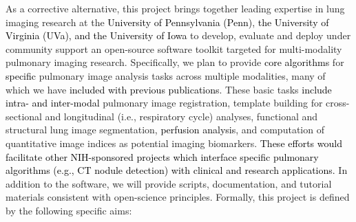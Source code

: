 \documentclass[11pt,]{article}
\begin{document}
As a corrective alternative, this project brings together leading
expertise in lung imaging research at the
\textcolor{black}{University of Pennsylvania (Penn)},
\textcolor{black}{the University of Virginia (UVa), and the University of Iowa}
to develop, evaluate and deploy under community support an open-source
software toolkit targeted for multi-modality pulmonary imaging research.
Specifically, we plan to provide \textcolor{black}{core algorithms} for
\textcolor{black}{specific} pulmonary image analysis tasks across
multiple modalities, many of which we have
\textcolor{black}{included with previous publications}. These basic
tasks \textcolor{black}{include intra- and inter-modal} pulmonary image
registration, template building for cross-sectional and longitudinal
(i.e., respiratory cycle) analyses, functional and structural lung image
segmentation, \textcolor{black}{perfusion analysis}, and computation of
quantitative image indices as potential imaging biomarkers.
\textcolor{black}{These efforts would
facilitate other NIH-sponsored projects} \textcolor{black}{
which interface specific pulmonary algorithms (e.g., CT nodule detection) with clinical
and research applications.} In addition to the software, we will provide
scripts, documentation, and tutorial materials consistent with
open-science principles. Formally, this project is defined by the
following specific aims:
\end{document}

